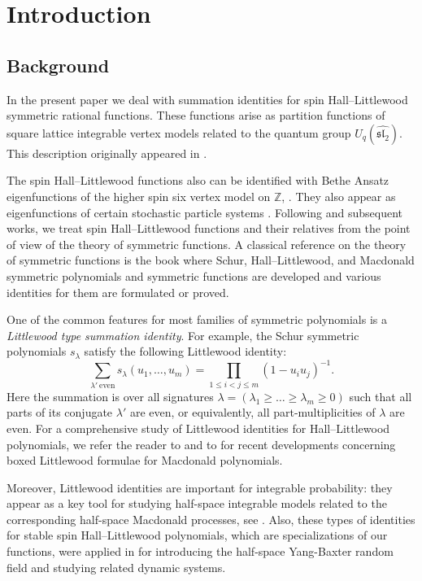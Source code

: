 \section{Introduction}
\label{sec:intro}
\subsection{Background}

In the present paper we deal with summation 
identities for spin Hall--Little\-wood symmetric
rational functions. These functions
arise
as 
partition functions
of square lattice integrable
vertex models
related to the quantum group $U_q(\widehat{\mathfrak{sl}_2})$. This description originally appeared in \cite{Bor17,BP18}.

The spin Hall--Littlewood functions
also can be identified with Bethe Ansatz eigenfunctions 
of the higher spin six vertex model on $\mathbb{Z}$, \cf \cite[Ch. VII]{KBI93}.
They also appear as eigenfunctions of certain stochastic particle systems
\cite{Pov13,BCPS15,CP16}. Following
\cite{Bor17,BP18} and subsequent works, we treat spin Hall--Littlewood functions and their relatives from the point of
view of the theory of symmetric functions.
A classical reference on the theory of symmetric functions is the book
\cite{Mac95} where Schur, Hall--Littlewood, and Macdonald symmetric
polynomials
and symmetric functions are developed and various identities for them are formulated or proved.


One of the common features 
for most
families of symmetric polynomials
is a \emph{Littlewood type summation identity}. For example, the Schur symmetric polynomials $s_{\lambda}$ satisfy the following Littlewood identity:
\begin{equation*}
\sum_{\lambda'\ \text{even}} s_{\lambda}(u_1, \dots, u_m)
=
\prod_{1 \leq i<j\leq m}
(1 - u_i u_j)^{-1}.
\end{equation*}
Here the summation is over all signatures $\lambda=(\lambda_1\ge \ldots\ge \lambda_m\ge0 )$ such that all parts of its conjugate $\lambda'$ are even, or equivalently, all part-multiplicities of $\lambda$ are even.
For a comprehensive study of Littlewood identities for
Hall–Littlewood polynomials, we refer the reader to \cite[Ch. III]{Mac95} and to \cite{War06,RW21} for recent developments concerning boxed Littlewood formulae for
Macdonald polynomials.

Moreover, Littlewood identities are important for integrable probability: they appear as a key tool for studying half-space integrable models related to the corresponding half-space Macdonald processes, see \cite{BBC20,BBCW18,BZ19}. Also, these types of identities for stable spin Hall--Littlewood polynomials, which are specializations of our functions, were applied in \cite{CD21} for introducing the half-space Yang-Baxter random field and studying related dynamic systems.

